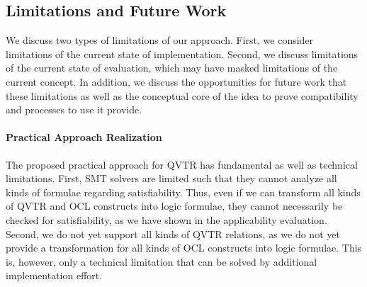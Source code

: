 \subsection{Limitations and Future Work}

We discuss two types of limitations of our approach.
First, we consider limitations of the current state of implementation.
Second, we discuss limitations of the current state of evaluation, which may have masked limitations of the current concept.
In addition, we discuss the opportunities for future work that these limitations as well as the conceptual core of the idea to prove compatibility and processes to use it provide.

\paragraph{Practical Approach Realization}
The proposed practical approach for \gls{QVTR} has fundamental as well as technical limitations.
First, \gls{SMT} solvers are limited such that they cannot analyze all kinds of formulae regarding satisfiability.
Thus, even if we can transform all kinds of \gls{QVTR} and \gls{OCL} constructs into logic formulae, they cannot necessarily be checked for satisfiability, as we have shown in the applicability evaluation.
Second, we do not yet support all kinds of \gls{QVTR} relations, as we do not yet provide a transformation for all kinds of \gls{OCL} constructs into logic formulae.
This is, however, only a technical limitation that can be solved by additional implementation effort.

